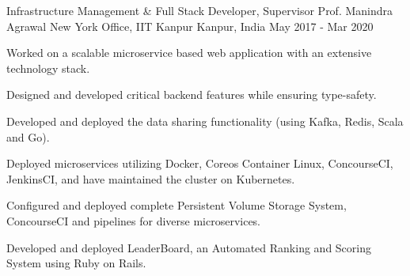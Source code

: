 \begin{cventries}

  \cventry
    {Infrastructure Management \& Full Stack Developer, Supervisor Prof. Manindra Agrawal} %
    {New York Office, IIT Kanpur} %
    {Kanpur, India} %
    {May 2017 - Mar 2020} %
    {
      \begin{cvitems} %
        \item {Worked on a scalable microservice based web application with an extensive technology stack.}
        \item {Designed and developed critical backend features while ensuring type-safety.}
        \item {Developed and deployed the data sharing functionality (using Kafka, Redis, Scala and Go).}
        \item {Deployed microservices utilizing Docker, Coreos Container Linux, ConcourseCI, JenkinsCI, and have maintained the cluster on Kubernetes.}
        \item {Configured and deployed complete Persistent Volume Storage System, ConcourseCI and pipelines for diverse microservices.}
        \item {Developed and deployed LeaderBoard, an Automated Ranking and Scoring System using Ruby on Rails.}
      \end{cvitems}
    }

\end{cventries}
